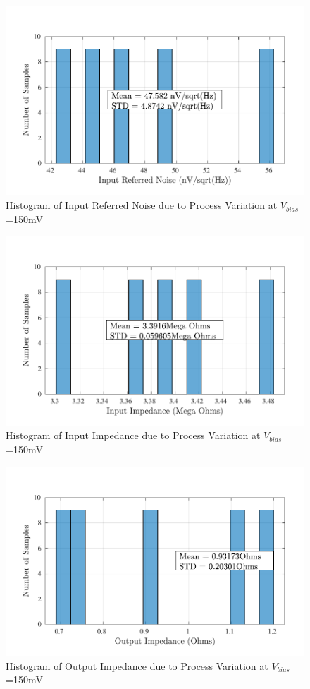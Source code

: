 \begin{figure} [H]
\centering
\includegraphics[scale=1]{Figures/Corners/Overall/Proc_Min/PDFs/Proc_Min_irn.pdf}
\caption{Histogram of Input Referred Noise due to Process Variation at $V_{bias}$=150mV}
\end{figure}

\begin{figure} [H]
\centering
\includegraphics[scale=1]{Figures/Corners/Overall/Proc_Min/PDFs/Proc_Min_zin.pdf}
\caption{Histogram of Input Impedance due to Process Variation at $V_{bias}$=150mV}
\end{figure}

\begin{figure} [H]
\centering
\includegraphics[scale=1]{Figures/Corners/Overall/Proc_Min/PDFs/Proc_Min_zout.pdf}
\caption{Histogram of Output Impedance due to Process Variation at $V_{bias}$=150mV}
\end{figure}

